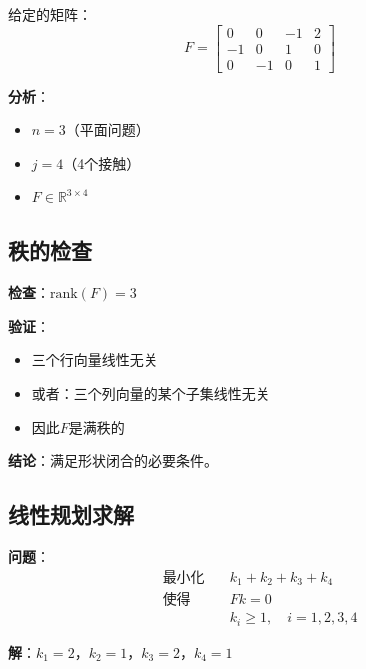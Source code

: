 \documentclass[12pt,a4paper]{article}
\begin{document}
给定的矩阵：
\begin{equation}
F = \begin{bmatrix}
0 & 0 & -1 & 2 \\
-1 & 0 & 1 & 0 \\
0 & -1 & 0 & 1
\end{bmatrix}
\end{equation}

\textbf{分析}：
\begin{itemize}
\item $n = 3$（平面问题）
\item $j = 4$（4个接触）
\item $F \in \mathbb{R}^{3 \times 4}$
\end{itemize}

\subsection{秩的检查}

\textbf{检查}：$\text{rank}(F) = 3$

\textbf{验证}：
\begin{itemize}
\item 三个行向量线性无关
\item 或者：三个列向量的某个子集线性无关
\item 因此$F$是满秩的
\end{itemize}

\textbf{结论}：满足形状闭合的必要条件。

\subsection{线性规划求解}

\textbf{问题}：
\begin{align}
\text{最小化} \quad & k_1 + k_2 + k_3 + k_4 \\
\text{使得} \quad & F k = 0 \\
& k_i \geq 1, \quad i = 1, 2, 3, 4
\end{align}

\textbf{解}：$k_1 = 2$，$k_2 = 1$，$k_3 = 2$，$k_4 = 1$
\end{document}
